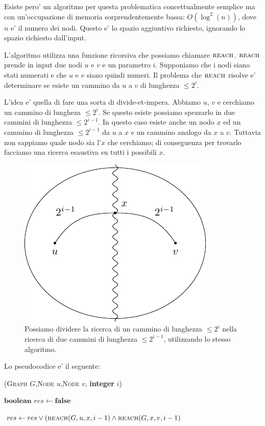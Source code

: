 Esiste pero' un algoritmo per questa problematica concettualmente semplice ma con un'occupazione di
memoria sorprendentemente bassa: $O(\log^{2}(n))$, dove $n$ e' il numero dei nodi. Questo e' lo
spazio aggiuntivo richiesto, ignorando lo spazio richiesto dall'input.

L'algoritmo utilizza una funzione ricorsiva che possiamo chiamare $\textsc{reach}$. $\textsc{reach}$ prende in input
due nodi $u$ e $v$ e un parametro $i$. Supponiamo che i nodi siano stati numerati e che $u$ e $v$
siano quindi numeri. Il problema che $\textsc{reach}$ risolve e' determinare se esiste un cammino da $u$ a
$v$ di lunghezza $\leq 2^{i}$.

L'idea e' quella di fare una sorta di divide-et-impera. Abbiamo $u$, $v$ e cerchiamo un cammino di
lungheza $\leq 2^{i}$. Se questo esiste possiamo spezzarlo in due cammini di lunghezza $\leq
2^{i-1}$. In questo caso esiste anche un nodo $x$ ed un cammino di lunghezza $\leq 2^{i-1}$ da $u$ a
$x$ e un cammino analogo da $x$ a $v$. Tuttavia non sappiamo quale nodo sia l'$x$ che cerchiamo; di
conseguenza per trovarlo facciamo una ricerca esaustiva su tutti i possibili $x$.

\begin{figure}[h]
    \begin{center}
        \includegraphics{./img/nondeterminism/SavitchAlgorithm.pdf}
        \caption{Possiamo dividere la ricerca di un cammino di lunghezza $\leq 2^{i}$ nella ricerca
        di due cammini di lunghezza $\leq 2^{i-1}$, utilizzando lo stesso algoritmo.}
    \end{center}
\end{figure}

Lo pseudocodice e' il seguente:

\begin{algorithm}
    \caption{\REACH(\textsc{Graph} $G$,\textsc{Node} $u$,\textsc{Node} $v$, \textbf{integer} $i$)}
    {
    }
    \Else
    {
        $\textbf{boolean } res \gets \textbf{false}$

        {
            $res \gets res \lor (\textsc{reach}(G,u,x,i-1) \land \textsc{reach}(G,x,v,i-1)$
        }

    }
\end{algorithm}

